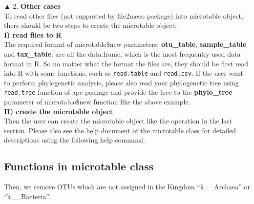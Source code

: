 \documentclass[
]{book}
\newenvironment{Shaded}{\begin{snugshade}}{\end{snugshade}}
\newcommand{\CommentTok}[1]{\textcolor[rgb]{0.56,0.35,0.01}{\textit{#1}}}
\newcommand{\FunctionTok}[1]{\textcolor[rgb]{0.00,0.00,0.00}{#1}}
\newcommand{\NormalTok}[1]{#1}
\newcommand{\SpecialCharTok}[1]{\textcolor[rgb]{0.00,0.00,0.00}{#1}}
\newcommand{\StringTok}[1]{\textcolor[rgb]{0.31,0.60,0.02}{#1}}
\begin{document}
▲ 2. \textbf{Other cases}\\
To read other files (not supported by file2meco package) into microtable object,
there should be two steps to create the microtable object:\\
\textbf{I) read files to R}\\
The required format of microtable\$new parameters, \textbf{otu\_table}, \textbf{sample\_table} and \textbf{tax\_table}, are all the data.frame, which is the most frequently-used data format in R.
So no matter what the format the files are, they should be first read into R with some functions, such as \texttt{read.table} and \texttt{read.csv}.
If the user want to perform phylogenetic analysis, please also read your phylogenetic tree using \texttt{read.tree} function of ape package and
provide the tree to the \textbf{phylo\_tree} parameter of microtable\$new function like the above example.\\
\textbf{II) create the microtable object}\\
Then the user can create the microtable object like the operation in the last section.
Please also see the help document of the microtable class for detailed descriptions using the following help command.

\begin{Shaded}
\end{Shaded}

\hypertarget{functions-in-microtable-class}{%
\subsection{Functions in microtable class}\label{functions-in-microtable-class}}

Then, we remove OTUs which are not assigned in the Kingdom ``k\_\_Archaea'' or ``k\_\_Bacteria''.

\begin{Shaded}
\end{Shaded}
\end{document}
